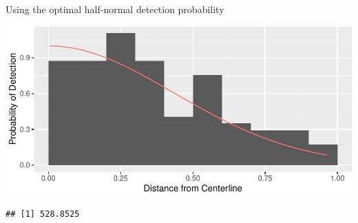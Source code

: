 \documentclass[
  ignorenonframetext,
]{beamer}
\newenvironment{Shaded}{\begin{snugshade}}{\end{snugshade}}
\newcommand{\ControlFlowTok}[1]{\textcolor[rgb]{0.13,0.29,0.53}{\textbf{#1}}}
\newcommand{\DataTypeTok}[1]{\textcolor[rgb]{0.13,0.29,0.53}{#1}}
\newcommand{\DecValTok}[1]{\textcolor[rgb]{0.00,0.00,0.81}{#1}}
\newcommand{\KeywordTok}[1]{\textcolor[rgb]{0.13,0.29,0.53}{\textbf{#1}}}
\newcommand{\NormalTok}[1]{#1}
\newcommand{\OperatorTok}[1]{\textcolor[rgb]{0.81,0.36,0.00}{\textbf{#1}}}
\newcommand{\StringTok}[1]{\textcolor[rgb]{0.31,0.60,0.02}{#1}}
\begin{document}
\begin{frame}[fragile]{Using the optimal half-normal detection
probability}
\protect\hypertarget{using-the-optimal-half-normal-detection-probability}{}

\includegraphics{distance_sampling_files/figure-beamer/unnamed-chunk-15-1.pdf}

\scriptsize

\begin{Shaded}
\end{Shaded}

\begin{verbatim}
## [1] 528.8525
\end{verbatim}

\end{frame}
\end{document}

